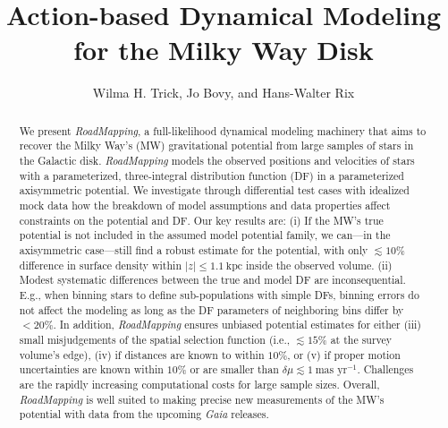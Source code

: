 \documentclass[iop,revtex4,numberedappendix,appendixfloats]{emulateapj}
\newcommand{\RM}{{\sl RoadMapping}}
\begin{document}
\title{Action-based Dynamical Modeling for the Milky Way Disk\\}

\author{Wilma H. Trick, Jo Bovy, and Hans-Walter Rix}



\begin{abstract}
We present \RM{}, a full-likelihood dynamical modeling machinery that aims to recover the Milky Way's (MW) gravitational potential from large samples of stars in the Galactic disk. \RM{} models the observed positions and velocities of stars with a parameterized, three-integral distribution function (DF) in a parameterized axisymmetric potential. We investigate through differential test cases with idealized mock data how the breakdown of model assumptions and data properties affect constraints on the potential and DF. Our key results are: (i) If the MW's true potential is not included in the assumed model potential family, we can---in the axisymmetric case---still find a robust estimate for the potential, with only $\lesssim10\%$ difference in surface density within $|z| \leq1.1~\text{kpc}$ inside the observed volume. (ii) Modest systematic differences between the true and model DF are inconsequential. E.g., when binning stars to define sub-populations with simple DFs, binning errors do not affect the modeling as long as the DF parameters of neighboring bins differ by $<20\%$. In addition, \RM{} ensures unbiased potential estimates for either (iii) small misjudgements of the spatial selection function (i.e., $\lesssim15\%$ at the survey volume's edge), (iv) if distances are known to within $10\%$, or (v) if proper motion uncertainties are known within $10\%$ or are smaller than $\delta \mu \lesssim 1~\text{mas yr}^{-1}$. Challenges are the rapidly increasing computational costs for large sample sizes. Overall, \RM{} is well suited to making precise new measurements of the MW's potential with data from the upcoming \emph{Gaia} releases.
\end{abstract}
\end{document}
